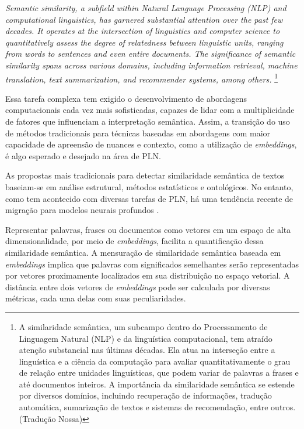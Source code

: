 \begin{citacao}
    \textit{Semantic similarity, a subfield within Natural Language Processing (NLP) and computational linguistics, has garnered substantial attention over the past few decades. It operates at the intersection of linguistics and computer science to quantitatively assess the degree of relatedness between linguistic units, ranging from words to sentences and even entire documents. The significance of semantic similarity spans across various domains, including information retrieval, machine translation, text summarization, and recommender systems, among others.} \cite{Similaridade-Semantica:1} \footnote{A similaridade semântica, um subcampo dentro do Processamento de Linguagem Natural (NLP) e da linguística computacional, tem atraído atenção substancial nas últimas décadas. Ela atua na interseção entre a linguística e a ciência da computação para avaliar quantitativamente o grau de relação entre unidades linguísticas, que podem variar de palavras a frases e até documentos inteiros. A importância da similaridade semântica se estende por diversos domínios, incluindo recuperação de informações, tradução automática, sumarização de textos e sistemas de recomendação, entre outros. (Tradução Nossa)}
\end{citacao}


Essa tarefa complexa tem exigido o desenvolvimento de abordagens computacionais cada vez mais sofisticadas, capazes de lidar com a multiplicidade de fatores que influenciam a interpretação semântica. Assim, a transição do uso de métodos tradicionais para técnicas baseadas em abordagens com maior capacidade de apreensão de nuances e contexto, como a utilização de \textit{embeddings}, é algo esperado e desejado na área de \ac{PLN}.

\begin{citacao}
    As propostas mais tradicionais para detectar similaridade semântica de textos baseiam-se em análise estrutural, métodos estatísticos e ontológicos. No entanto, como tem acontecido com diversas tarefas de \ac{PLN}, há uma tendência recente de migração para modelos neurais profundos \cite{Similaridade-Semantica:2}.
\end{citacao}

Representar palavras, frases ou documentos como vetores em um espaço de alta dimensionalidade, por meio de \textit{embeddings}, facilita a quantificação dessa similaridade semântica. A mensuração de similaridade semântica baseada em \textit{embeddings} implica que palavras com significados semelhantes serão representadas por vetores proximamente localizados em sua distribuição no espaço vetorial. A distância entre dois vetores de \textit{embeddings} pode ser calculada por diversas métricas, cada uma delas com suas peculiaridades.

